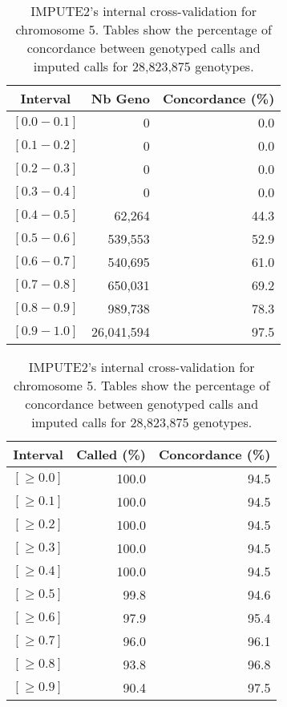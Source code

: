 \documentclass[10pt,twoside,english]{scrartcl}
\begin{document}
\begin{table}[H]
\protect\caption{IMPUTE2's internal cross-validation for chromosome 5. Tables show the
percentage of concordance between genotyped calls and imputed calls
for 28,823,875 genotypes.\label{tab:cross_validation_chr_5}}

\centering

\begin{tabular}{crr}
\hline 
\multicolumn{1}{c}{\textbf{Interval}}
 & \multicolumn{1}{c}{\textbf{Nb Geno}}
 & \multicolumn{1}{c}{\textbf{Concordance (\%)}}
\\
\hline 

$[0.0-0.1]$ & 0 & 0.0\\
$[0.1-0.2]$ & 0 & 0.0\\
$[0.2-0.3]$ & 0 & 0.0\\
$[0.3-0.4]$ & 0 & 0.0\\
$[0.4-0.5]$ & 62,264 & 44.3\\
$[0.5-0.6]$ & 539,553 & 52.9\\
$[0.6-0.7]$ & 540,695 & 61.0\\
$[0.7-0.8]$ & 650,031 & 69.2\\
$[0.8-0.9]$ & 989,738 & 78.3\\
$[0.9-1.0]$ & 26,041,594 & 97.5\\
\hline 
\end{tabular}
\hfill
\begin{tabular}{crr}
\hline 
\multicolumn{1}{c}{\textbf{Interval}}
 & \multicolumn{1}{c}{\textbf{Called (\%)}}
 & \multicolumn{1}{c}{\textbf{Concordance (\%)}}
\\
\hline 

$[\geq 0.0]$ & 100.0 & 94.5\\
$[\geq 0.1]$ & 100.0 & 94.5\\
$[\geq 0.2]$ & 100.0 & 94.5\\
$[\geq 0.3]$ & 100.0 & 94.5\\
$[\geq 0.4]$ & 100.0 & 94.5\\
$[\geq 0.5]$ & 99.8 & 94.6\\
$[\geq 0.6]$ & 97.9 & 95.4\\
$[\geq 0.7]$ & 96.0 & 96.1\\
$[\geq 0.8]$ & 93.8 & 96.8\\
$[\geq 0.9]$ & 90.4 & 97.5\\
\hline 
\end{tabular}


\end{table}
\end{document}

